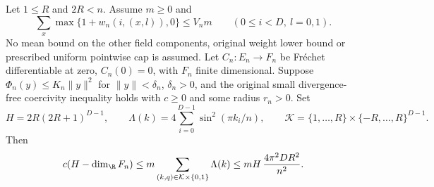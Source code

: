 \begin{theorem}\label{thm:volume-mean-finite}
Let $1\leq R$ and $2R<n$. Assume $m\geq0$ and
\begin{equation}\label{eq:total-positive-means}
 \sum_x\max\{1+w_n(i,(x,l)),0\}\leq V_n m
       \qquad(0\leq i<D,\ l=0,1).
\end{equation}
No mean bound on the other field components, original weight lower bound or
prescribed uniform pointwise cap is assumed. Let $C_n:E_n\to F_n$ be
Fr\'echet differentiable at zero, $C_n(0)=0$, with $F_n$ finite dimensional.
Suppose $\Phi_n(y)\leq K_n\|y\|^2$ for $\|y\|<\delta_n$, $\delta_n>0$,
and the original small divergence-free coercivity inequality holds with
$c\geq0$ and some radius $r_n>0$. Set
\[
 H=2R(2R+1)^{D-1},\qquad
 \Lambda(k)=4\sum_{i=0}^{D-1}\sin^2(\pi k_i/n),
 \qquad\mathcal K=\{1,\ldots,R\}\times\{-R,\ldots,R\}^{D-1}.
\]
Then
\begin{equation}\label{eq:volume-mean-finite}
 c(H-\dim_{\R}F_n)\leq m\sum_{(k,q)\in\mathcal K\times\{0,1\}}\Lambda(k)
 \leq mH\,\frac{4\pi^2 D R^2}{n^2}.
\end{equation}
\end{theorem}
